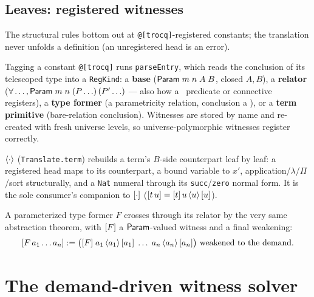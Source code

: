 \section{Leaves: registered witnesses}
\label{sec:leaves}

The structural rules bottom out at \texttt{@[trocq]}-registered constants; the
translation never unfolds a definition (an unregistered head is an error).

\begin{definition}
  \label{def:reg-kind}
  \leanok
  Tagging a constant \texttt{@[trocq]} runs \texttt{parseEntry}, which reads the
  conclusion of its telescoped type into a \texttt{RegKind}: a \textbf{base}
  ($\mathsf{Param}\;m\;n\;A\;B$, closed $A,B$), a \textbf{relator}
  ($\forall \ldots, \mathsf{Param}\;m\;n\;(P\ldots)\,(P'\ldots)$ --- also how a
  \PropSort\ predicate or connective registers), a \textbf{type former} (a
  parametricity relation, conclusion a \SortU), or a \textbf{term primitive}
  (bare-relation conclusion). Witnesses are stored by name and re-created with
  fresh universe levels, so universe-polymorphic witnesses register correctly.
\end{definition}

\begin{definition}
  \label{def:translate-term}
  \leanok
  $\langle \cdot \rangle$ (\texttt{Translate.term}) rebuilds a term's $B$-side counterpart
  leaf by leaf: a registered head maps to its counterpart, a bound variable to
  $x'$, application/$\lambda$/$\Pi$/sort structurally, and a \texttt{Nat} numeral
  through its \texttt{succ}/\texttt{zero} normal form. It is the sole consumer's
  companion to $[ \cdot ]$ ($[ t\,u ] = [ t ]\,u\,\langle u \rangle\,[ u ]$).
\end{definition}

A parameterized type former $F$ crosses through its relator by the very same
abstraction theorem, with $[ F ]$ a $\mathsf{Param}$-valued witness and a final
weakening:
\[
  [ F\,a_1 \ldots a_n ] := \big([ F ]\; a_1\,\langle a_1 \rangle\,[ a_1 ]\; \ldots\; a_n\,\langle a_n \rangle\,[ a_n ]\big)\ \text{weakened to the demand}.
\]

\chapter{The demand-driven witness solver}
\label{chap:solver}

